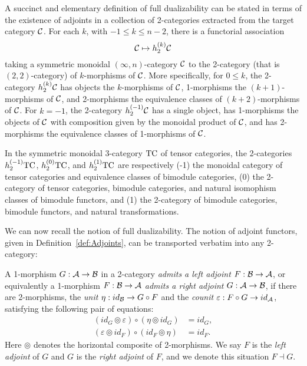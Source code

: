 \documentclass{amsart}
\begin{document}
A succinct and elementary definition of full dualizability can be stated in terms of the existence of adjoints in a collection of 2-categories extracted from the target category $\mathcal C$.  For each $k$, with $-1 \leq k \leq n-2$, there is a functorial association
\[
\mathcal C \mapsto h_2^{(k)} \mathcal C
\]
taking a symmetric monoidal $(\infty,n)$-category $\mathcal C$ to the 2-category (that is $(2,2)$-category) of $k$-morphisms of $\mathcal C$.  More specifically, for $0 \leq k$, the 2-category $h_2^{(k)} \mathcal C$ has objects the $k$-morphisms of $\mathcal C$, 1-morphisms the $(k+1)$-morphisms of $\mathcal C$, and 2-morphisms the equivalence classes of $(k+2)$-morphisms of $\mathcal C$.  For $k=-1$, the 2-category $h_2^{(-1)} \mathcal C$ has a single object, has 1-morphisms the objects of $\mathcal C$ with composition given by the monoidal product of $\mathcal C$, and has 2-morphisms the equivalence classes of 1-morphisms of $\mathcal C$.

\begin{appexample}
	In the symmetric monoidal 3-category $\mathrm{TC}$ of tensor categories, the 2-categories $h^{(-1)}_2 \mathrm{TC}$, $h^{(0)}_2 \mathrm{TC}$, and $h^{(1)}_2 \mathrm{TC}$ are respectively (-1) the monoidal category of tensor categories and equivalence classes of bimodule categories, (0) the 2-category of tensor categories, bimodule categories, and natural isomophism classes of bimodule functors, and (1) the 2-category of bimodule categories, bimodule functors, and natural transformations.
\end{appexample}

We can now recall the notion of full dualizability.  The notion of adjoint functors, given in Definition~\ref{def:Adjoints}, can be transported verbatim into any 2-category:

\begin{appdefinition} \label{def:adjoints_in_bicat}
		A 1-morphism $G: \mathcal A \to \mathcal B$ in a 2-category {\em admits a left adjoint} $F: \mathcal B \to \mathcal A$, or equivalently a 1-morphism $F: \mathcal B \to \mathcal A$ {\em admits a right adjoint} $G: \mathcal A \to \mathcal B$, if there are 2-morphisms, the {\em unit} $\eta: id_{\mathcal B} \to G \circ F$ and the {\em counit} $\varepsilon: F \circ G \to id_{\mathcal A}$, satisfying the following pair of equations:
		\begin{align*}
			(id_{G} \circledcirc \varepsilon  ) \circ (  \eta \circledcirc id_{G}) &= id_{G}, \\
			(\varepsilon \circledcirc id_{F}) \circ (id_{F} \circledcirc \eta) &= id_{F}.
		\end{align*}
	Here $\circledcirc$ denotes the horizontal composite of 2-morphisms.
	We say $F$ is the {\em left adjoint} of $G$ and $G$ is the {\em right adjoint} of $F$, and we denote this situation $F \dashv G$.
\end{appdefinition}
\end{document}
